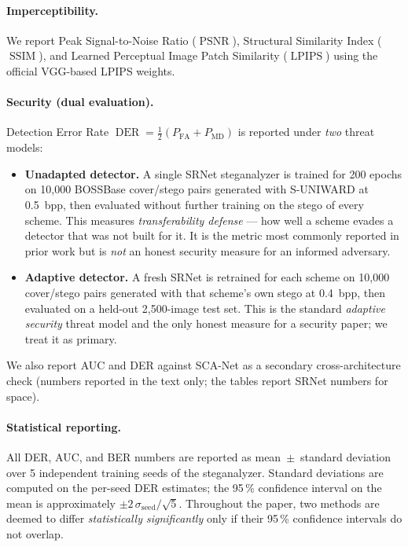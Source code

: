 \documentclass[10pt,a4paper]{article}
\DeclareMathOperator{\DER}{DER}
\DeclareMathOperator{\PSNR}{PSNR}
\DeclareMathOperator{\SSIM}{SSIM}
\DeclareMathOperator{\LPIPS}{LPIPS}
\begin{document}
\paragraph{Imperceptibility.} We report Peak Signal-to-Noise Ratio
($\PSNR$), Structural Similarity Index ($\SSIM$), and Learned
Perceptual Image Patch Similarity ($\LPIPS$) using the official
VGG-based LPIPS weights.

\paragraph{Security (dual evaluation).} Detection Error Rate
$\DER = \tfrac{1}{2}(P_{\text{FA}} + P_{\text{MD}})$ is reported under
\emph{two} threat models:
\begin{itemize}[leftmargin=2.2em,itemsep=1pt,topsep=2pt]
  \item \textbf{Unadapted detector.} A single SRNet steganalyzer is
        trained for 200 epochs on 10{,}000 BOSSBase cover/stego pairs
        generated with S-UNIWARD at 0.5~bpp, then evaluated without
        further training on the stego of every scheme. This measures
        \emph{transferability defense} --- how well a scheme evades a
        detector that was not built for it. It is the metric most
        commonly reported in prior work but is \emph{not} an honest
        security measure for an informed adversary.
  \item \textbf{Adaptive detector.} A fresh SRNet is retrained for each
        scheme on 10{,}000 cover/stego pairs generated with that
        scheme's own stego at 0.4~bpp, then evaluated on a held-out
        2{,}500-image test set. This is the standard \emph{adaptive
        security} threat model and the only honest measure for a
        security paper; we treat it as primary.
\end{itemize}
We also report AUC and DER against SCA-Net as a secondary
cross-architecture check (numbers reported in the text only; the
tables report SRNet numbers for space).

\paragraph{Statistical reporting.} All DER, AUC, and BER numbers are
reported as mean~$\pm$~standard deviation over 5 independent training
seeds of the steganalyzer. Standard deviations are computed on the
per-seed DER estimates; the 95\,\% confidence interval on the mean is
approximately $\pm 2\,\sigma_{\text{seed}}/\sqrt{5}$. Throughout the
paper, two methods are deemed to differ \emph{statistically
significantly} only if their 95\,\% confidence intervals do not
overlap.
\end{document}
